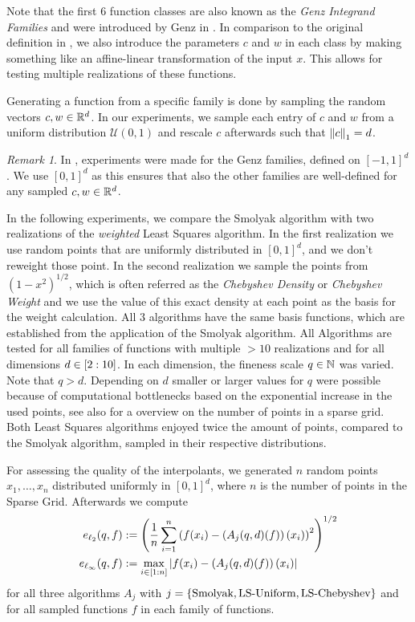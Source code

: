 \documentclass[12pt, oneside]{amsart}
\theoremstyle{definition}
\theoremstyle{remark}
\newtheorem{remark}[thm]{Remark}
\numberwithin{equation}{section}
\begin{document}
Note that the first $6$ function classes are also known as the \emph{Genz 
Integrand Families} and were introduced by Genz in \cite{GenzTesting_1984, 
GenzPackage_1987}. In comparison to the original definition in 
\cite{Simulationlib_2013}, we also introduce the parameters $c$ and $w$ in 
each class by making something like an affine-linear transformation of the 
input $x$. 
This allows for testing multiple realizations of these functions. 

Generating a function from a specific family is done 
by sampling the random vectors $c, w \in\R^d$. In our experiments, we sample 
each entry of $c$ and $w$ from a uniform distribution $\mathcal{U}(0,1)$ and 
rescale $c$ afterwards such that $\norm[1]{c}=d$.

\begin{remark}
	In \cite{BarthelmannHighDim_2000}, experiments were made for the Genz 
	families, defined on $[-1,1]^d$. We use $[0,1]^d$ as this ensures that also 
	the other families are well-defined for any sampled $c,w\in\R^d$.
\end{remark}

In the following experiments, we compare the Smolyak algorithm with two 
realizations of the \emph{weighted} Least Squares algorithm. In the first 
realization we use random points that are uniformly distributed in $[0,1]^d$, 
and we don't reweight those point. In the second realization we sample the 
points from $(1-x^2)^{1/2}$, which is often referred as the 
\emph{Chebyshev Density} or \emph{Chebyshev Weight} and we use the value of 
this exact density at each point as the basis for the weight calculation. 
All 3 algorithms have the same basis functions, which are established from the 
application of the Smolyak algorithm. 
All Algorithms are tested for all families of functions with multiple $>10$ 
realizations and for all dimensions $d\in \indexset[2]{10}$. In each dimension, 
the fineness scale $q\in\N$ was varied. Note that $q>d$. Depending on $d$ 
smaller or larger values for $q$ were possible because of computational 
bottlenecks based on the exponential increase in the used points, see also 
\cite{BurkardtCounting_2014} for a overview on the number of points in a sparse 
grid. Both Least Squares algorithms enjoyed twice the amount of points, 
compared to the Smolyak algorithm, sampled in their respective distributions.

For assessing the quality of the interpolants, we generated $n$ random points 
$x_1, \ldots, x_n$ distributed uniformly in $[0,1]^d$, where $n$ is the number 
of points in the 
Sparse Grid. Afterwards we compute
\begin{align*} 
	e_{\ell_2}(q,f) &\defn \left(\frac{1}{n}\sum_{i=1}^{n}
	\left(f(x_i)-\left(A_j(q,d)(f)\right)(x_i)\right)^2\right)^{1/2}\\
	e_{\ell_\infty}(q,f) &\defn \max_{i\in\indexset{n}} 
	\abs{f(x_i)-\left(A_j(q,d)(f)\right)(x_i)}
\end{align*}
for all three algorithms $A_j$ with $j=\set{\text{Smolyak}, \text{LS-Uniform}, 
\text{LS-Chebyshev}}$ and for all sampled functions $f$ in each family of 
functions.
\end{document}
